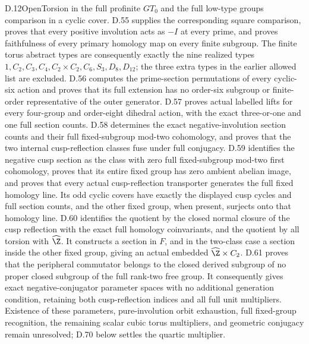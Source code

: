 \begin{claim}{D.12}{Open}{Torsion in the full profinite $GT_0$ and the full low-type groups}
comparison in a cyclic cover. D.55 supplies the corresponding square comparison, proves that every positive involution acts as $-I$ at every prime, and proves faithfulness of every primary homology map on every finite subgroup. The finite torus abstract types are consequently exactly the nine realized types $1,C_2,C_3,C_4,C_2\times C_2,C_6,S_3,D_8,D_{12}$; the three extra types in the earlier allowed list are excluded. D.56 computes the prime-section permutations of every cyclic-six action and proves that its full extension has no order-six subgroup or finite-order representative of the outer generator. D.57 proves actual labelled lifts for every four-group and order-eight dihedral action, with the exact three-or-one and one full section counts. D.58 determines the exact negative-involution section counts and their full fixed-subgroup mod-two cohomology, and proves that the two internal cusp-reflection classes fuse under full conjugacy. D.59 identifies the negative cusp section as the class with zero full fixed-subgroup mod-two first cohomology, proves that its entire fixed group has zero ambient abelian image, and proves that every actual cusp-reflection transporter generates the full fixed homology line. Its odd cyclic covers have exactly the displayed cusp cycles and full section counts, and the other fixed group, when present, surjects onto that homology line. D.60 identifies the quotient by the closed normal closure of the cusp reflection with the exact full homology coinvariants, and the quotient by all torsion with $\widehat\Z$. It constructs a section in $F$, and in the two-class case a section inside the other fixed group, giving an actual embedded $\widehat\Z\times C_2$. D.61 proves that the peripheral commutator belongs to the closed derived subgroup of no proper closed subgroup of the full rank-two free group. It consequently gives exact negative-conjugator parameter spaces with no additional generation condition, retaining both cusp-reflection indices and all full unit multipliers. Existence of these parameters, pure-involution orbit exhaustion, full fixed-group recognition, the remaining scalar cubic torus multipliers, and geometric conjugacy remain unresolved; D.70 below settles the quartic multiplier.


\end{claim}
